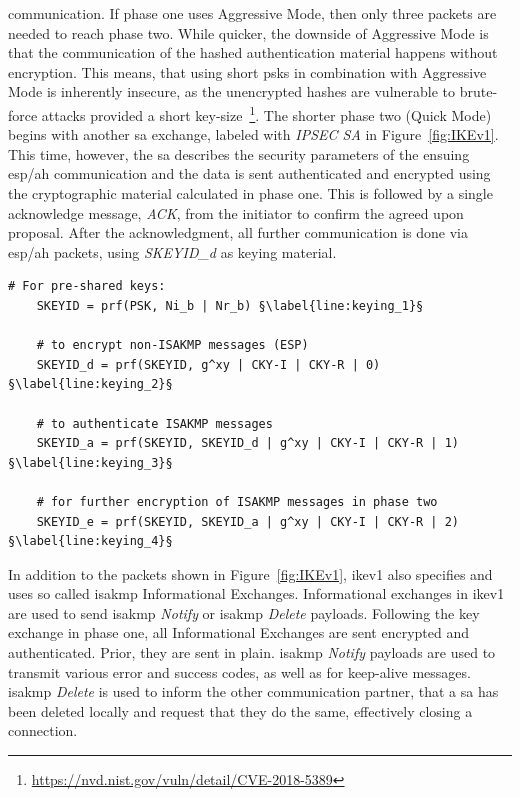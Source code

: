 communication. If phase one uses Aggressive Mode, then only three packets are needed to reach phase two. While quicker, the downside of Aggressive Mode is that the communication of the hashed authentication material happens without encryption. This means, that using short \acp{psk} in combination with Aggressive Mode is inherently insecure, as the unencrypted hashes are vulnerable to brute-force attacks provided a short key-size~\footnote{\url{https://nvd.nist.gov/vuln/detail/CVE-2018-5389}}. The shorter phase two (Quick Mode) begins with another \ac{sa} exchange, labeled with \emph{IPSEC SA} in Figure~\ref{fig:IKEv1}. This time, however, the \ac{sa} describes the security parameters of the ensuing \ac{esp}/\ac{ah} communication and the data is sent authenticated and encrypted using the cryptographic material calculated in phase one. This is followed by a single acknowledge message, \emph{ACK}, from the initiator to confirm the agreed upon proposal. After the acknowledgment, all further communication is done via \ac{esp}/\ac{ah} packets, using \emph{SKEYID\_d} as keying material.

\begin{lstlisting}[float=ht, caption=IKE keying material construction., label=lst:keying, escapechar=§]
	# For pre-shared keys: 
	SKEYID = prf(PSK, Ni_b | Nr_b) §\label{line:keying_1}§
	
	# to encrypt non-ISAKMP messages (ESP)
	SKEYID_d = prf(SKEYID, g^xy | CKY-I | CKY-R | 0) §\label{line:keying_2}§
	
	# to authenticate ISAKMP messages
	SKEYID_a = prf(SKEYID, SKEYID_d | g^xy | CKY-I | CKY-R | 1) §\label{line:keying_3}§
	
	# for further encryption of ISAKMP messages in phase two
	SKEYID_e = prf(SKEYID, SKEYID_a | g^xy | CKY-I | CKY-R | 2) §\label{line:keying_4}§
\end{lstlisting}

In addition to the packets shown in Figure~\ref{fig:IKEv1}, \ac{ike}v1 also specifies and uses so called \ac{isakmp} Informational Exchanges. Informational exchanges in \ac{ike}v1 are used to send \ac{isakmp} \emph{Notify} or \ac{isakmp} \emph{Delete} payloads. Following the key exchange in phase one, all Informational Exchanges are sent encrypted and authenticated. Prior, they are sent in plain. \ac{isakmp} \emph{Notify} payloads are used to transmit various error and success codes, as well as for keep-alive messages. \ac{isakmp} \emph{Delete} is used to inform the other communication partner, that a \ac{sa} has been deleted locally and request that they do the same, effectively closing a connection. 

